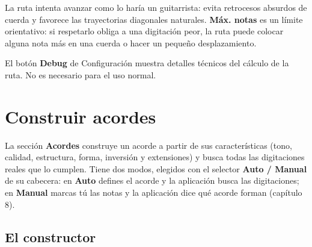 \documentclass[a4paper,11pt,oneside]{report}
\begin{document}
La ruta intenta avanzar como lo haría un guitarrista: evita retrocesos absurdos de cuerda y favorece las trayectorias diagonales naturales. \textbf{Máx. notas} es un límite orientativo: si respetarlo obliga a una digitación peor, la ruta puede colocar alguna nota más en una cuerda o hacer un pequeño desplazamiento.

El botón \textbf{Debug} de Configuración muestra detalles técnicos del cálculo de la ruta. No es necesario para el uso normal.

\chapter{Construir acordes}\label{construir-acordes}

La sección \textbf{Acordes} construye un acorde a partir de sus características (tono, calidad, estructura, forma, inversión y extensiones) y busca todas las digitaciones reales que lo cumplen. Tiene dos modos, elegidos con el selector \textbf{Auto / Manual} de su cabecera: en \textbf{Auto} defines el acorde y la aplicación busca las digitaciones; en \textbf{Manual} marcas tú las notas y la aplicación dice qué acorde forman (capítulo 8).

\Needspace{3.5cm}
\section{El constructor}\label{el-constructor}
\end{document}
